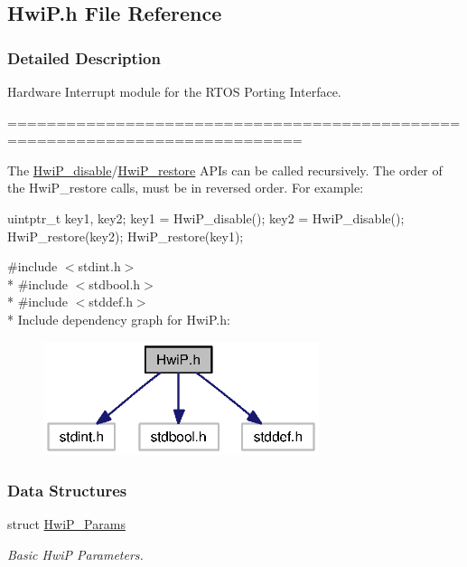 \subsection{Hwi\+P.\+h File Reference}
\label{_hwi_p_8h}


\subsubsection{Detailed Description}
Hardware Interrupt module for the R\+T\+O\+S Porting Interface. 

============================================================================

The \hyperlink{_hwi_p_8h_aac47ffab62f7d25d736b58e40be17425}{Hwi\+P\+\_\+disable}/\hyperlink{_hwi_p_8h_a979cdfbd9993f6c5eedef8570efbd62e}{Hwi\+P\+\_\+restore} A\+P\+Is can be called recursively. The order of the Hwi\+P\+\_\+restore calls, must be in reversed order. For example\+: 
\begin{DoxyCode}
uintptr\_t key1, key2;
key1 = HwiP_disable();
key2 = HwiP_disable();
HwiP_restore(key2);
HwiP_restore(key1);
\end{DoxyCode}
 

{\ttfamily \#include $<$stdint.\+h$>$}\\*
{\ttfamily \#include $<$stdbool.\+h$>$}\\*
{\ttfamily \#include $<$stddef.\+h$>$}\\*
Include dependency graph for Hwi\+P.\+h\+:
\nopagebreak
\begin{figure}[H]
\begin{center}
\leavevmode
\includegraphics[width=229pt]{_hwi_p_8h__incl}
\end{center}
\end{figure}
\subsubsection*{Data Structures}
\begin{DoxyCompactItemize}
\item 
struct \hyperlink{struct_hwi_p___params}{Hwi\+P\+\_\+\+Params}
\begin{DoxyCompactList}\small\item\em Basic Hwi\+P Parameters. \end{DoxyCompactList}\end{DoxyCompactItemize}
